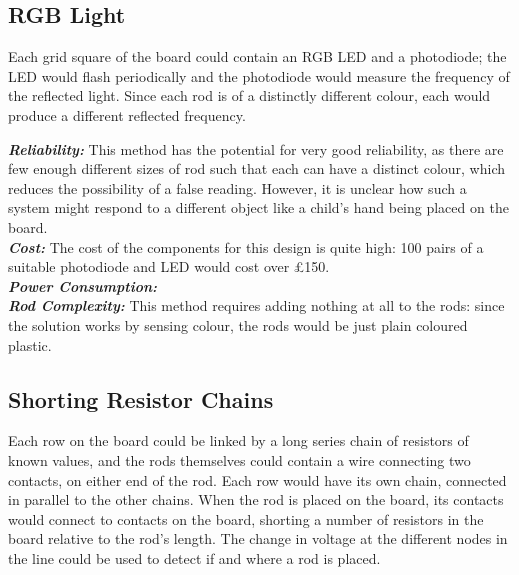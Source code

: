 
\subsection{RGB Light}
\label{rgb}

Each grid square of the board could contain an RGB LED and a photodiode; the LED would flash periodically and the photodiode would measure the frequency of the reflected light. Since each rod is of a distinctly different colour, each would produce a different reflected frequency.\\

{
\setlength{\parindent}{0pt} 

\textbf{\textit{Reliability:}} This method has the potential for very good reliability, as there are few enough different sizes of rod such that each can have a distinct colour, which reduces the possibility of a false reading. However, it is unclear how such a system might respond to a different object like a child's hand being placed on the board. \\

\textbf{\textit{Cost:}} The cost of the components for this design is quite high: 100 pairs of a suitable photodiode \cite{KPS5130P52:online} and LED \cite{L154A4SU86:online} would cost over £150.  \\

\textbf{\textit{Power Consumption:}} \\

\textbf{\textit{Rod Complexity:}} This method requires adding nothing at all to the rods: since the solution works by sensing colour, the rods would be just plain coloured plastic.\\
}


\subsection{Shorting Resistor Chains}
\label{resistors}

Each row on the board could be linked by a long series chain of resistors of known values, and the rods themselves could contain a wire connecting two contacts, on either end of the rod. Each row would have its own chain, connected in parallel to the other chains. When the rod is placed on the board, its contacts would connect to contacts on the board, shorting a number of resistors in the board relative to the rod's length. The change in voltage at the different nodes in the line could be used to detect if and where a rod is placed.\\

